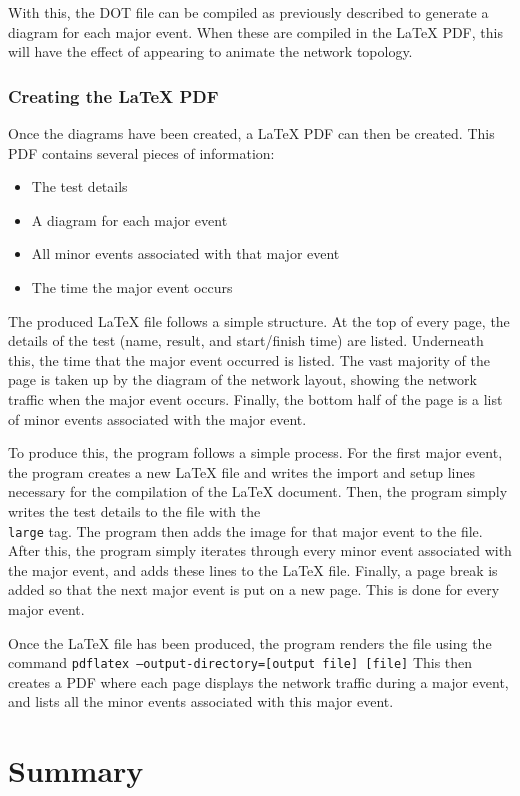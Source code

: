 With this, the DOT file can be compiled as previously described to generate a diagram for each major event.
When these are compiled in the LaTeX PDF, this will have the effect of appearing to animate the network topology.


\subsubsection{Creating the LaTeX PDF}
Once the diagrams have been created, a LaTeX PDF can then be created.
This PDF contains several pieces of information:
\begin{itemize}
    \item The test details
    \item A diagram for each major event
    \item All minor events associated with that major event
    \item The time the major event occurs
\end{itemize}
The produced LaTeX file follows a simple structure.
At the top of every page, the details of the test (name, result, and start/finish time) are listed.
Underneath this, the time that the major event occurred is listed. 
The vast majority of the page is taken up by the diagram of the network layout, showing the network traffic when the major event occurs.
Finally, the bottom half of the page is a list of minor events associated with the major event.

To produce this, the program follows a simple process.
For the first major event, the program creates a new LaTeX file and writes the import and setup lines necessary for the compilation of the LaTeX document.
Then, the program simply writes the test details to the file with the \texttt{\\large} tag.
The program then adds the image for that major event to the file. 
After this, the program simply iterates through every minor event associated with the major event, and adds these lines to the LaTeX file.
Finally, a page break is added so that the next major event is put on a new page.
This is done for every major event.

Once the LaTeX file has been produced, the program renders the file using the command
\texttt{pdflatex --output-directory=[output file] [file]}
This then creates a PDF where each page displays the network traffic during a major event, and lists all the minor events associated with this major event.

\section{Summary}

